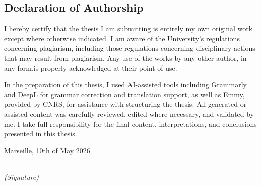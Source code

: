 \begin{large}
\chapter*{Declaration of Authorship}

I hereby certify that the thesis I am submitting is entirely my own original work except where otherwise indicated. I am aware of the University’s regulations concerning plagiarism, including those regulations concerning disciplinary actions that may result from plagiarism. Any use of the works by any other author, in any form,is properly acknowledged at their point of use. 
\newline

In the preparation of this thesis, I used AI-assisted tools including Grammarly and DeepL for grammar correction and translation support, as well as Emmy, provided by CNRS, for assistance with structuring the thesis. All generated or assisted content was carefully reviewed, edited where necessary, and validated by me. I take full responsibility for the final content, interpretations, and conclusions presented in this thesis. 


\vspace{3cm}
Marseille, 10th of May 2026
\vspace{2cm}

\hspace*{6cm}%
\dotfill\\
\hspace*{7cm}%
\textit{(Signature)}

\end{large}
